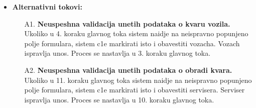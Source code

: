 \begin{itemize}
{}
\item{\textbf{Alternativni tokovi:} 
\begin{enumerate}
    \item [A1.] \textbf{Neuspeshna validacija unetih podataka o kvaru vozila.} Ukoliko u 4. koraku glavnog toka sistem naidje na neispravno popunjeno polje formulara, sistem c1e markirati isto i obavestiti vozacha. Vozach ispravlja unos. Proces se nastavlja u 3. koraku glavnog toka.
   \item [A2.] \textbf{Neuspeshna validacija unetih podataka o obradi kvara.} Ukoliko u 11. koraku glavnog toka sistem naidje na neispravno popunjeno polje formulara, sistem c1e markirati isto i obavestiti servisera. Serviser ispravlja unos. Proces se nastavlja u 10. koraku glavnog toka.
\end{enumerate}
}
\end{itemize}

